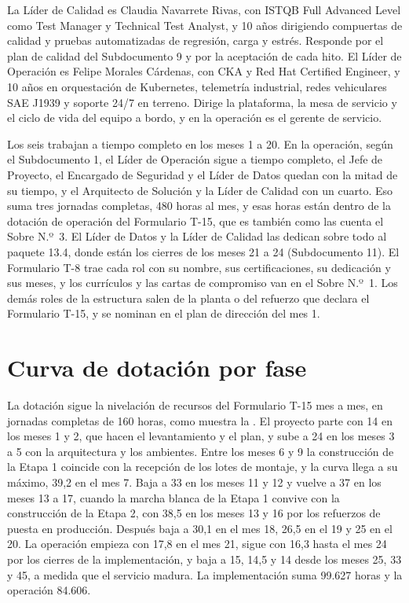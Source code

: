 La Líder de Calidad es Claudia Navarrete Rivas, con ISTQB Full Advanced Level como Test Manager y
Technical Test Analyst, y 10 años dirigiendo compuertas de calidad y pruebas automatizadas de regresión,
carga y estrés. Responde por el plan de calidad del Subdocumento 9 y por la aceptación de cada hito. El
Líder de Operación es Felipe Morales Cárdenas, con CKA y Red Hat Certified Engineer, y 10 años en
orquestación de Kubernetes, telemetría industrial, redes vehiculares SAE J1939 y soporte 24/7 en
terreno. Dirige la plataforma, la mesa de servicio y el ciclo de vida del equipo a bordo, y en la
operación es el gerente de servicio.

Los seis trabajan a tiempo completo en los meses 1 a 20. En la operación, según el Subdocumento 1, el
Líder de Operación sigue a tiempo completo, el Jefe de Proyecto, el Encargado de Seguridad y el Líder de
Datos quedan con la mitad de su tiempo, y el Arquitecto de Solución y la Líder de Calidad con un cuarto.
Eso suma tres jornadas completas, 480 horas al mes, y esas horas están dentro de la dotación de
operación del Formulario T-15, que es también como las cuenta el Sobre N.º~3. El Líder
de Datos y la Líder de Calidad las dedican sobre todo al paquete 13.4, donde están los cierres de los
meses 21 a 24 (Subdocumento 11). El Formulario T-8 trae cada rol con su nombre, sus certificaciones, su
dedicación y sus meses, y los currículos y las cartas de compromiso van en el Sobre N.º~1. Los demás
roles de la estructura salen de la planta o del refuerzo que declara el Formulario T-15, y se nominan en
el plan de dirección del mes 1.

\section{Curva de dotación por fase}\label{sec:12-curva-de-dotacion-por-fase}

La dotación sigue la nivelación de recursos del Formulario T-15 mes a mes, en jornadas completas de 160
horas, como muestra la . El proyecto parte con 14 en los meses 1 y 2, que hacen el
levantamiento y el plan, y sube a 24 en los meses 3 a 5 con la arquitectura y los ambientes. Entre los
meses 6 y 9 la construcción de la Etapa 1 coincide con la recepción de los lotes de montaje, y la curva
llega a su máximo, 39,2 en el mes 7. Baja a 33 en los meses 11 y 12 y vuelve a 37 en los meses 13 a 17,
cuando la marcha blanca de la Etapa 1 convive con la construcción de la Etapa 2, con 38,5 en los meses 13
y 16 por los refuerzos de puesta en producción. Después baja a 30,1 en el mes 18, 26,5 en el 19 y 25 en
el 20. La operación empieza con 17,8 en el mes 21, sigue con 16,3 hasta el mes 24 por los cierres de la
implementación, y baja a 15, 14,5 y 14 desde los meses 25, 33 y 45, a medida que el servicio madura. La
implementación suma 99.627 horas y la operación 84.606.

